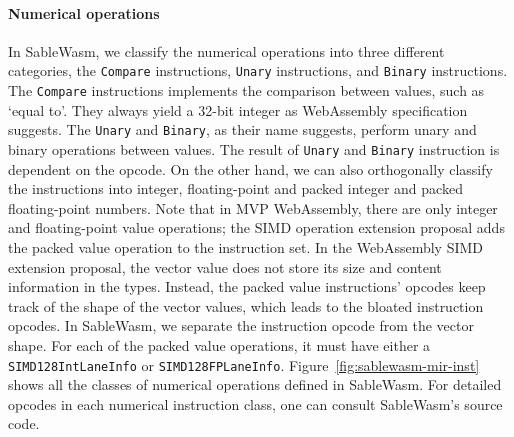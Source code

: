 \paragraph{Numerical operations}
In SableWasm, we classify the numerical operations into three different
categories, the \texttt{Compare} instructions, \texttt{Unary} instructions, and
\texttt{Binary} instructions. The \texttt{Compare} instructions implements the
comparison between values, such as `equal to'. They always yield a 32-bit
integer as WebAssembly specification suggests. The \texttt{Unary} and
\texttt{Binary}, as their name suggests, perform unary and binary operations
between values. The result of \texttt{Unary} and \texttt{Binary} instruction is
dependent on the opcode. On the other hand, we can also orthogonally classify
the instructions into integer, floating-point and packed integer and packed
floating-point numbers. Note that in MVP WebAssembly, there are only integer and
floating-point value operations; the SIMD operation extension proposal adds the
packed value operation to the instruction set. In the WebAssembly SIMD extension
proposal, the vector value does not store its size and content information in
the types. Instead, the packed value instructions' opcodes keep track of the
shape of the vector values, which leads to the bloated instruction opcodes. In
SableWasm, we separate the instruction opcode from the vector shape. For each of
the packed value operations, it must have either a \texttt{SIMD128IntLaneInfo}
or \texttt{SIMD128FPLaneInfo}. Figure~\ref{fig:sablewasm-mir-inst} shows all the
classes of numerical operations defined in SableWasm. For detailed opcodes in
each numerical instruction class, one can consult SableWasm's source code.

